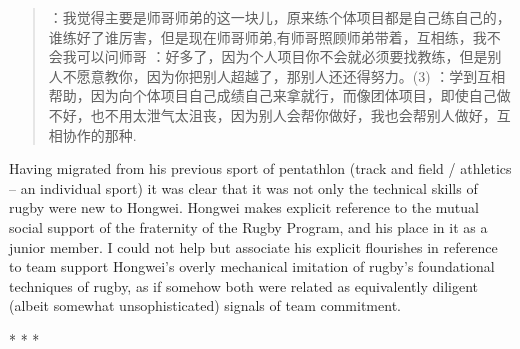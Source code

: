 \begin{CJK}{UTF8}{gbsn}
  \begin{quotation}
    ：我觉得主要是师哥师弟的这一块儿，原来练个体项目都是自己练自己的，谁练好了谁厉害，但是现在师哥师弟,有师哥照顾师弟带着，互相练，我不会我可以问师哥
    ：好多了，因为个人项目你不会就必须要找教练，但是别人不愿意教你，因为你把别人超越了，那别人还还得努力。(3) ：学到互相帮助，因为向个体项目自己成绩自己来拿就行，而像团体项目，即使自己做不好，也不用太泄气太沮丧，因为别人会帮你做好，我也会帮别人做好，互相协作的那种.
  \end{quotation}
\end{CJK}

Having migrated from his previous sport of pentathlon (track and field / athletics -- an individual sport) it was clear that it was not only the technical skills of rugby were new to Hongwei.  Hongwei makes explicit reference to the mutual social support of the fraternity of the Rugby Program, and his place in it as a junior member.  I could not help but associate his explicit flourishes in reference to team support Hongwei's overly mechanical imitation of rugby’s foundational techniques of rugby, as if somehow both were related as equivalently diligent (albeit somewhat unsophisticated) signals of team commitment.

\begin{center}
  * * *
\end{center}

